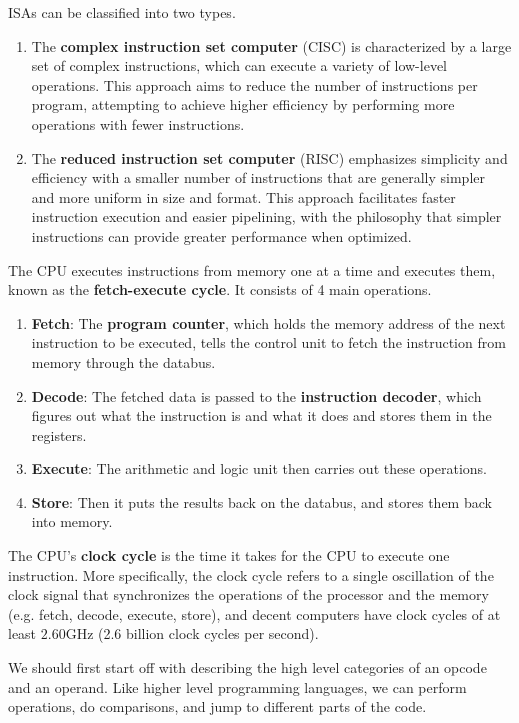   \begin{example}
    ISAs can be classified into two types. 
    \begin{enumerate} 
      \item The \textbf{complex instruction set computer} (CISC) is characterized by a large set of complex instructions, which can execute a variety of low-level operations. This approach aims to reduce the number of instructions per program, attempting to achieve higher efficiency by performing more operations with fewer instructions.
      \item The \textbf{reduced instruction set computer} (RISC) emphasizes simplicity and efficiency with a smaller number of instructions that are generally simpler and more uniform in size and format. This approach facilitates faster instruction execution and easier pipelining, with the philosophy that simpler instructions can provide greater performance when optimized.
    \end{enumerate}
  \end{example}

  The CPU executes instructions from memory one at a time and executes them, known as the \textbf{fetch-execute cycle}. It consists of 4 main operations. 
  \begin{enumerate} 
    \item \textbf{Fetch}: The \textbf{program counter}, which holds the memory address of the next instruction to be executed, tells the control unit to fetch the instruction from memory through the databus. 
    \item \textbf{Decode}: The fetched data is passed to the \textbf{instruction decoder}, which figures out what the instruction is and what it does and stores them in the registers.
    \item \textbf{Execute}: The arithmetic and logic unit then carries out these operations. 
    \item \textbf{Store}: Then it puts the results back on the databus, and stores them back into memory.
  \end{enumerate} 
  The CPU's \textbf{clock cycle} is the time it takes for the CPU to execute one instruction. More specifically, the clock cycle refers to a single oscillation of the clock signal that synchronizes the operations of the processor and the memory (e.g. fetch, decode, execute, store), and decent computers have clock cycles of at least $2.60$GHz (2.6 billion clock cycles per second). 

  We should first start off with describing the high level categories of an opcode and an operand. Like higher level programming languages, we can perform operations, do comparisons, and jump to different parts of the code. 


